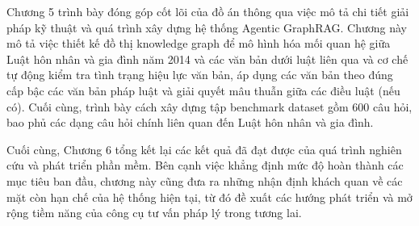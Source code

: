 \documentclass[../DoAn.tex]{subfiles}
\begin{document}
Chương 5 trình bày đóng góp cốt lõi của đồ án thông qua việc mô tả chi tiết giải pháp kỹ thuật và quá trình xây dựng hệ thống Agentic GraphRAG. Chương này mô tả việc thiết kế đồ thị knowledge graph để mô hình hóa mối quan hệ giữa Luật hôn nhân và gia đình năm 2014 và các văn bản dưới luật liên qua và cơ chế tự động kiểm tra tình trạng hiệu lực văn bản, áp dụng các văn bản theo đúng cấp bậc các văn bản pháp luật và giải quyết mâu thuẫn giữa các điều luật (nếu có). Cuối cùng, trình bày cách xây dựng tập benchmark dataset gồm 600 câu hỏi, bao phủ các dạng câu hỏi chính liên quan đến Luật hôn nhân và gia đình.

Cuối cùng, Chương 6 tổng kết lại các kết quả đã đạt được của quá trình nghiên cứu và phát triển phần mềm. Bên cạnh việc khẳng định mức độ hoàn thành các mục tiêu ban đầu, chương này cũng đưa ra những nhận định khách quan về các mặt còn hạn chế của hệ thống hiện tại, từ đó đề xuất các hướng phát triển và mở rộng tiềm năng của công cụ tư vấn pháp lý trong tương lai.
\end{document}
